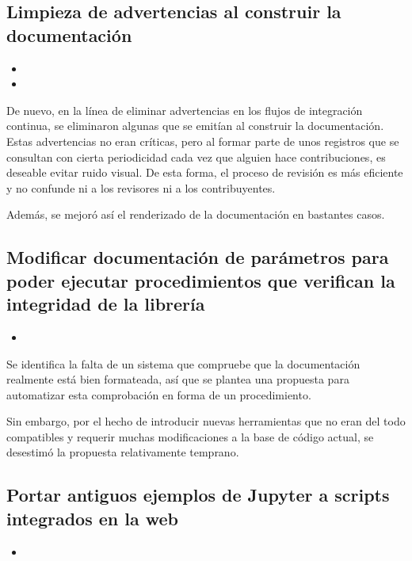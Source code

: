 \subsection{Limpieza de advertencias al construir la documentación}

\begin{itemize}
    \item {}
    \item {}
\end{itemize}

De nuevo, en la línea de eliminar advertencias en los flujos de integración continua, se eliminaron algunas que se emitían al construir la documentación. Estas advertencias no eran críticas, pero al formar parte de unos registros que se consultan con cierta periodicidad cada vez que alguien hace contribuciones, es deseable evitar ruido visual. De esta forma, el proceso de revisión es más eficiente y no confunde ni a los revisores ni a los contribuyentes.

Además, se mejoró así el renderizado de la documentación en bastantes casos.

\subsection{Modificar documentación de parámetros para poder ejecutar procedimientos que verifican la integridad de la librería}

\begin{itemize}
    \item {}
\end{itemize}

Se identifica la falta de un sistema que compruebe que la documentación realmente está bien formateada, así que se plantea una propuesta para automatizar esta comprobación en forma de un procedimiento.

Sin embargo, por el hecho de introducir nuevas herramientas que no eran del todo compatibles y requerir muchas modificaciones a la base de código actual, se desestimó la propuesta relativamente temprano.

\subsection{Portar antiguos ejemplos de Jupyter a scripts integrados en la web}

\begin{itemize}
    \item {}
\end{itemize}

